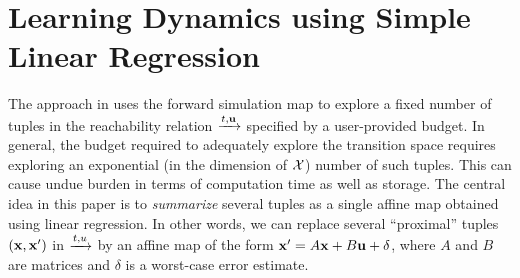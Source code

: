 




\section{Learning Dynamics using Simple Linear Regression}

The approach in \cite{zutshi2014multiple} uses the forward simulation
map to explore a fixed number of tuples in the reachability relation
$\xrightarrow{t,\mathbf{u}}$ specified by a user-provided budget.  In general, the
budget required to adequately explore the transition space requires
exploring an exponential (in the dimension of $\mathcal{X}$) number
of such tuples. This can cause undue burden in terms of computation
time as well as storage.  The central idea in this paper is to {\em
summarize} several tuples as a single affine map obtained using linear
regression.  In other words, we can replace several ``proximal''
tuples $(\mathbf{x},\mathbf{x}')$ in $\xrightarrow{t,u}$ by an affine map of the form
$\mathbf{x}' = A\mathbf{x} + B\mathbf{u} + \delta$, where $A$ and $B$ are matrices and
$\delta$ is a worst-case error estimate.

